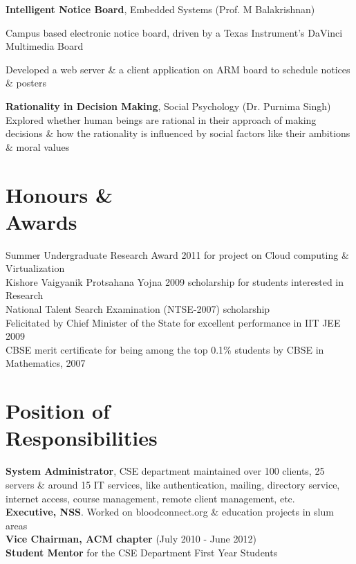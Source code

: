 \documentclass[margin,line]{resume}
\begin{document}
\begin{resume}
    \textbf{Intelligent Notice Board}, Embedded Systems \hfill(Prof. M Balakrishnan)
    \begin{list2}
        \item Campus based electronic notice board, driven by a Texas Instrument's DaVinci Multimedia Board
        \item Developed a web server \& a client application on ARM board to schedule notices \& posters
    \end{list2}

    \textbf{Rationality in Decision Making}, Social Psychology                     \hfill(Dr. Purnima Singh)
\\    Explored whether human beings are rational in their approach of making decisions \& how the rationality is influenced by social factors like their ambitions \& moral values

    \section{\mysidestyle Honours \&\\Awards} 
    Summer Undergraduate Research Award 2011 for project on Cloud computing \& Virtualization \vspace{1mm}\\%
    Kishore Vaigyanik Protsahana Yojna 2009 scholarship for students interested in Research\vspace{1mm}\\%
    National Talent Search Examination (NTSE-2007) scholarship\vspace{1mm}\\%
    Felicitated by Chief Minister of the State for excellent performance in IIT JEE 2009 \vspace{1mm}\\%
    CBSE merit certificate for being among the top 0.1\% students by CBSE in Mathematics, 2007
    
    \section{\mysidestyle Position of \\Responsibilities}
    \textbf{System Administrator}, CSE department maintained over 100 clients, 25 servers \& around 15 IT services, like authentication, mailing, directory service, internet access, course management, remote client management, etc.\\
    \textbf{Executive, NSS}. Worked on bloodconnect.org \& education projects in slum areas\\
    \textbf{Vice Chairman, ACM chapter} (July 2010 - June 2012)\\
    \textbf{Student Mentor} for the CSE Department First Year Students\\

\end{resume}
\end{document}
